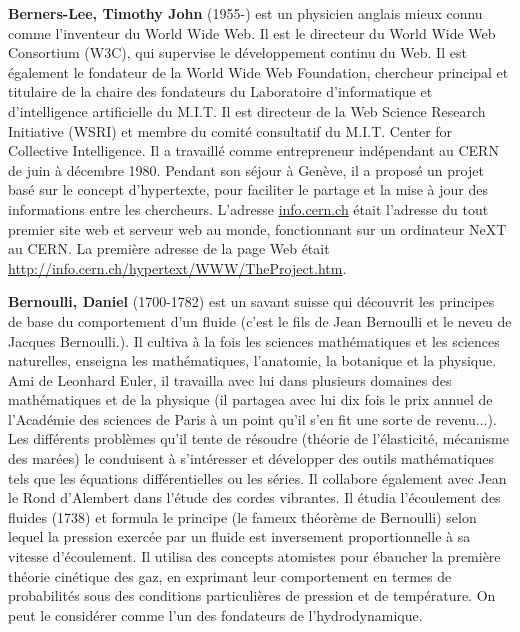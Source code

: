 \textbf{Berners-Lee, Timothy John} (1955-) est un physicien anglais mieux connu comme l'inventeur du World Wide Web. Il est le directeur du World Wide Web Consortium (W3C), qui supervise le développement continu du Web. Il est également le fondateur de la World Wide Web Foundation, chercheur principal et titulaire de la chaire des fondateurs du Laboratoire d'informatique et d'intelligence artificielle du M.I.T. Il est directeur de la Web Science Research Initiative (WSRI) et membre du comité consultatif du M.I.T. Center for Collective Intelligence. Il a travaillé comme entrepreneur indépendant au CERN de juin à décembre 1980. Pendant son séjour à Genève, il a proposé un projet basé sur le concept d'hypertexte, pour faciliter le partage et la mise à jour des informations entre les chercheurs. L'adresse \url{info.cern.ch} était l'adresse du tout premier site web et serveur web au monde, fonctionnant sur un ordinateur NeXT au CERN. La première adresse de la page Web était \url{http://info.cern.ch/hypertext/WWW/TheProject.htm}.

\textbf{Bernoulli, Daniel} (1700-1782) est un savant suisse qui découvrit les principes de base du comportement d'un fluide (c'est le fils de Jean Bernoulli et le neveu de Jacques Bernoulli.). Il cultiva à la fois les sciences mathématiques et les sciences naturelles, enseigna les mathématiques, l'anatomie, la botanique et la physique. Ami de Leonhard Euler, il travailla avec lui dans plusieurs domaines des mathématiques et de la physique (il partagea avec lui dix fois le prix annuel de l'Académie des sciences de Paris à un point qu'il s'en fit une sorte de revenu...). Les différents problèmes qu'il tente de résoudre (théorie de l'élasticité, mécanisme des marées) le conduisent à s'intéresser et développer des outils mathématiques tels que les équations différentielles ou les séries. Il collabore également avec Jean le Rond d'Alembert dans l'étude des cordes vibrantes. Il étudia l'écoulement des fluides (1738) et formula le principe (le fameux théorème de Bernoulli) selon lequel la pression exercée par un fluide est inversement proportionnelle à sa vitesse d'écoulement. Il utilisa des concepts atomistes pour ébaucher la première théorie cinétique des gaz, en exprimant leur comportement en termes de probabilités sous des conditions particulières de pression et de température. On peut le considérer comme l'un des fondateurs de l'hydrodynamique.

